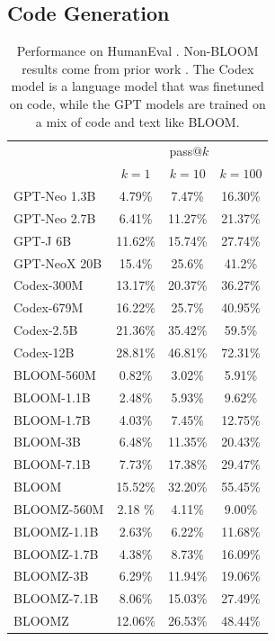 \documentclass[twoside,11pt]{article}
\begin{document}
\subsection{Code Generation}
\label{sec:eval:code}

\begin{table}[ht!]
    \begin{center}
    \begin{small}
    \begin{sc}
    \begin{tabular}{lccc}
    \toprule
    & \multicolumn{3}{c}{pass@$k$} \\
    & $k=1$ & $k=10$ & $k=100$ \\
    \midrule
    GPT-Neo 1.3B & 4.79\% & 7.47\% & 16.30\% \\
    GPT-Neo 2.7B & 6.41\% & 11.27\% & 21.37\% \\
    GPT-J 6B & 11.62\% & 15.74\% & 27.74\% \\
    GPT-NeoX 20B & 15.4\% & 25.6\% & 41.2\% \\
    \midrule
    Codex-300M & 13.17\% & 20.37\% & 36.27\% \\
    Codex-679M & 16.22\% & 25.7\% & 40.95\% \\
    Codex-2.5B & 21.36\% & 35.42\% & 59.5\% \\
    Codex-12B & 28.81\% & 46.81\% & 72.31\% \\
    \midrule
    BLOOM-560M & 0.82\% & 3.02\% & 5.91\% \\
    BLOOM-1.1B & 2.48\% & 5.93\% & 9.62\% \\
    BLOOM-1.7B & 4.03\% & 7.45\% & 12.75\% \\
    BLOOM-3B & 6.48\% & 11.35\% & 20.43\% \\
    BLOOM-7.1B & 7.73\% & 17.38\% & 29.47\% \\
    BLOOM & 15.52\% & 32.20\% & 55.45\% \\
    \midrule
    BLOOMZ-560M & 2.18 \% & 4.11\% & 9.00\% \\
    BLOOMZ-1.1B & 2.63\% & 6.22\% & 11.68\% \\
    BLOOMZ-1.7B & 4.38\% & 8.73\% & 16.09\% \\
    BLOOMZ-3B & 6.29\% & 11.94\% & 19.06\% \\
    BLOOMZ-7.1B & 8.06\% & 15.03\% & 27.49\% \\
    BLOOMZ & 12.06\% & 26.53\% & 48.44\% \\
    \bottomrule
    \end{tabular}
    \caption{
        Performance on HumanEval \citep{chen2021evaluating}. Non-BLOOM results come from prior work \citep{chen2021evaluating,fried2022incoder}. The Codex model is a language model that was finetuned on code, while the GPT models \citep{black2021gpt,wang2021gpt,black2022gpt} are trained on a mix of code and text like BLOOM.
    }
    \label{tab:humaneval}
    \end{sc}
    \end{small}
    \end{center}
\end{table}
\end{document}
